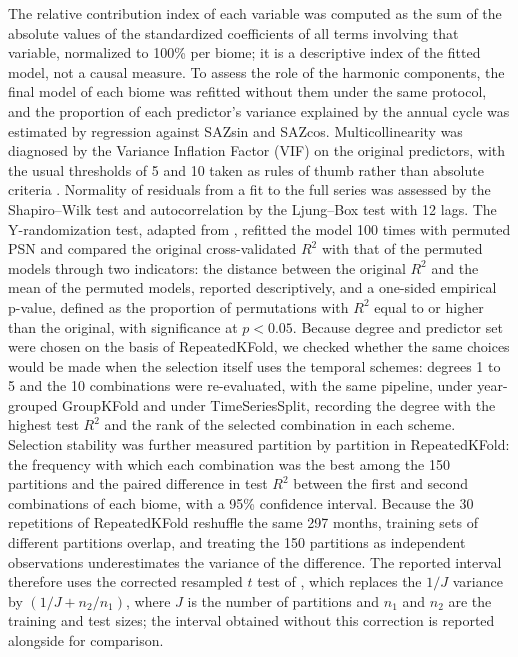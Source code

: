 \documentclass[a4paper,fleqn]{cas-dc}
\begin{document}
The relative contribution index of each variable was computed as the sum of the absolute values of the standardized coefficients of all terms involving that variable, normalized to 100\% per biome; it is a descriptive index of the fitted model, not a causal measure. To assess the role of the harmonic components, the final model of each biome was refitted without them under the same protocol, and the proportion of each predictor's variance explained by the annual cycle was estimated by regression against SAZsin and SAZcos. Multicollinearity was diagnosed by the Variance Inflation Factor (VIF) on the original predictors, with the usual thresholds of 5 and 10 taken as rules of thumb rather than absolute criteria \citep{obrien2007}. Normality of residuals from a fit to the full series was assessed by the Shapiro--Wilk test and autocorrelation by the Ljung--Box test with 12 lags. The Y-randomization test, adapted from \citet{guimaraes2024}, refitted the model 100 times with permuted PSN and compared the original cross-validated $R^2$ with that of the permuted models through two indicators: the distance between the original $R^2$ and the mean of the permuted models, reported descriptively, and a one-sided empirical p-value, defined as the proportion of permutations with $R^2$ equal to or higher than the original, with significance at $p < 0.05$. Because degree and predictor set were chosen on the basis of RepeatedKFold, we checked whether the same choices would be made when the selection itself uses the temporal schemes: degrees 1 to 5 and the 10 combinations were re-evaluated, with the same pipeline, under year-grouped GroupKFold and under TimeSeriesSplit, recording the degree with the highest test $R^2$ and the rank of the selected combination in each scheme. Selection stability was further measured partition by partition in RepeatedKFold: the frequency with which each combination was the best among the 150 partitions and the paired difference in test $R^2$ between the first and second combinations of each biome, with a 95\% confidence interval. Because the 30 repetitions of RepeatedKFold reshuffle the same 297 months, training sets of different partitions overlap, and treating the 150 partitions as independent observations underestimates the variance of the difference. The reported interval therefore uses the corrected resampled $t$ test of \citet{nadeau2003}, which replaces the $1/J$ variance by $(1/J + n_2/n_1)$, where $J$ is the number of partitions and $n_1$ and $n_2$ are the training and test sizes; the interval obtained without this correction is reported alongside for comparison.
\end{document}

